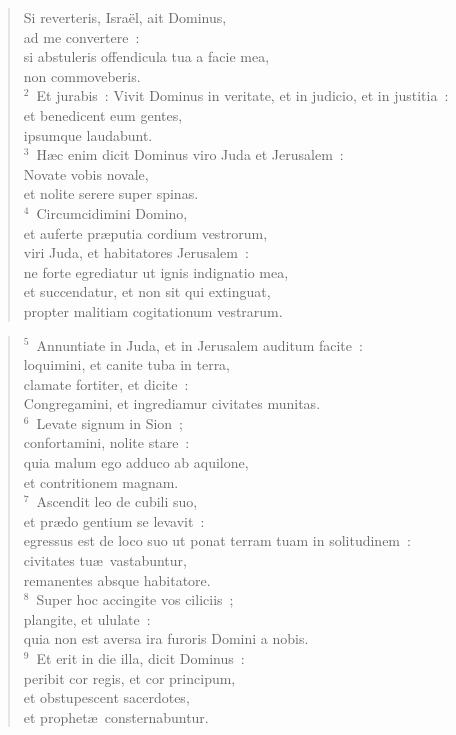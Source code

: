 \begin{flushleft}\begin{verse}\vspace{-19pt}Si reverteris, Isra\"el, ait Dominus,\\ ad me convertere~:\\ si abstuleris offendicula tua a facie mea,\\ non commoveberis.\\
${}^{2}$~Et jurabis~: Vivit Dominus in veritate, et in judicio, et in justitia~:\\ et benedicent eum gentes,\\ ipsumque laudabunt.\\
${}^{3}$~H\ae c enim dicit Dominus viro Juda et Jerusalem~:\\ Novate vobis novale,\\ et nolite serere super spinas.\\
${}^{4}$~Circumcidimini Domino,\\ et auferte pr\ae putia cordium vestrorum,\\ viri Juda, et habitatores Jerusalem~:\\ ne forte egrediatur ut ignis indignatio mea,\\ et succendatur, et non sit qui extinguat,\\ propter malitiam cogitationum vestrarum.\end{verse}\end{flushleft}


\begin{flushleft}\begin{verse}${}^{5}$~Annuntiate in Juda, et in Jerusalem auditum facite~:\\ loquimini, et canite tuba in terra,\\ clamate fortiter, et dicite~:\\ Congregamini, et ingrediamur civitates munitas.\\
${}^{6}$~Levate signum in Sion~;\\ confortamini, nolite stare~:\\ quia malum ego adduco ab aquilone,\\ et contritionem magnam.\\
${}^{7}$~Ascendit leo de cubili suo,\\ et pr\ae do gentium se levavit~:\\ egressus est de loco suo ut ponat terram tuam in solitudinem~:\\ civitates tu\ae\ vastabuntur,\\ remanentes absque habitatore.\\
${}^{8}$~Super hoc accingite vos ciliciis~;\\ plangite, et ululate~:\\ quia non est aversa ira furoris Domini a nobis.\\
${}^{9}$~Et erit in die illa, dicit Dominus~:\\ peribit cor regis, et cor principum,\\ et obstupescent sacerdotes,\\ et prophet\ae\ consternabuntur.\end{verse}\end{flushleft}


